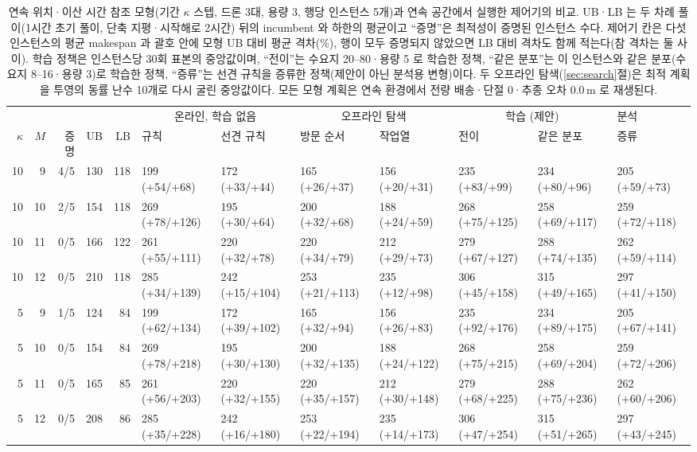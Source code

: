 \begin{table}[t]
\centering
\caption{연속 위치·이산 시간 참조 모형(기간 $\kappa$ 스텝, 드론 3대, 용량 3, 행당 인스턴스 5개)과 연속 공간에서 실행한 제어기의 비교. UB·LB 는 두 차례 풀이(1시간 초기 풀이, 단축 지평·시작해로 2시간) 뒤의 incumbent 와 하한의 평균이고 ``증명''은 최적성이 증명된 인스턴스 수다. 제어기 칸은 다섯 인스턴스의 평균 makespan 과 괄호 안에 모형 UB 대비 평균 격차(\%), 행이 모두 증명되지 않았으면 LB 대비 격차도 함께 적는다(참 격차는 둘 사이). 학습 정책은 인스턴스당 30회 표본의 중앙값이며, ``전이''는 수요지 20--80·용량 5 로 학습한 정책, ``같은 분포''는 이 인스턴스와 같은 분포(수요지 8--16·용량 3)로 학습한 정책, ``증류''는 선견 규칙을 증류한 정책(제안이 아닌 분석용 변형)이다. 두 오프라인 탐색(\ref{sec:search}절)은 최적 계획을 투영의 동률 난수 10개로 다시 굴린 중앙값이다. 모든 모형 계획은 연속 환경에서 전량 배송·단절 0·추종 오차 0.0\,m 로 재생된다.}
\label{tab:cont}
\scriptsize\setlength{\tabcolsep}{1.9pt}
\begin{tabular}{rrrrrlllllll}
\toprule
 & & & & & \multicolumn{2}{c}{온라인, 학습 없음} & \multicolumn{2}{c}{오프라인 탐색} & \multicolumn{2}{c}{학습 (제안)} & 분석 \\
\cmidrule(lr){6-7}\cmidrule(lr){8-9}\cmidrule(lr){10-11}\cmidrule(lr){12-12}
$\kappa$ & $M$ & 증명 & UB & LB & 규칙 & 선견 규칙 & 방문 순서 & 작업열 & 전이 & 같은 분포 & 증류 \\
\midrule
10 & 9 & 4/5 & 130 & 118 & 199 (+54/+68) & 172 (+33/+44) & 165 (+26/+37) & 156 (+20/+31) & 235 (+83/+99) & 234 (+80/+96) & 205 (+59/+73) \\
10 & 10 & 2/5 & 154 & 118 & 269 (+78/+126) & 195 (+30/+64) & 200 (+32/+68) & 188 (+24/+59) & 268 (+75/+125) & 258 (+69/+117) & 259 (+72/+118) \\
10 & 11 & 0/5 & 166 & 122 & 261 (+55/+111) & 220 (+32/+78) & 220 (+34/+79) & 212 (+29/+73) & 279 (+67/+127) & 288 (+74/+135) & 262 (+59/+114) \\
10 & 12 & 0/5 & 210 & 118 & 285 (+34/+139) & 242 (+15/+104) & 253 (+21/+113) & 235 (+12/+98) & 306 (+45/+158) & 315 (+49/+165) & 297 (+41/+150) \\
\midrule
5 & 9 & 1/5 & 124 & 84 & 199 (+62/+134) & 172 (+39/+102) & 165 (+32/+94) & 156 (+26/+83) & 235 (+92/+176) & 234 (+89/+175) & 205 (+67/+141) \\
5 & 10 & 0/5 & 154 & 84 & 269 (+78/+218) & 195 (+30/+130) & 200 (+32/+135) & 188 (+24/+122) & 268 (+75/+215) & 258 (+69/+204) & 259 (+72/+206) \\
5 & 11 & 0/5 & 165 & 85 & 261 (+56/+203) & 220 (+32/+155) & 220 (+35/+157) & 212 (+30/+148) & 279 (+68/+225) & 288 (+75/+236) & 262 (+60/+206) \\
5 & 12 & 0/5 & 208 & 86 & 285 (+35/+228) & 242 (+16/+180) & 253 (+22/+194) & 235 (+14/+173) & 306 (+47/+254) & 315 (+51/+265) & 297 (+43/+245) \\
\bottomrule
\end{tabular}
\end{table}
